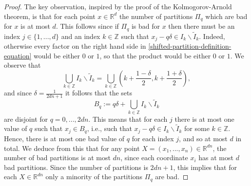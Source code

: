 \documentclass[twoside,11pt]{article}
\begin{document}
\begin{proof}
    The key observation, inspired by the proof of the Kolmogorov-Arnold theorem, is that for each point $x\in \mathbb{R}^d$ the number of partitions $\Pi_q$ which are bad for $x$ is at most $d$. This follows since if $\Pi_q$ is bad for $x$ then there must be an index $j \in \{1,...,d\}$ and an index $k\in \mathbb{Z}$ such that $x_j - q\delta\in I_k \backslash \tilde{I}_k$. Indeed, otherwise every factor on the right hand side in \eqref{shifted-partition-definition-equation} would be either $0$ or $1$, so that the product would be either $0$ or $1$. We observe that 
    \begin{equation}
        \bigcup_{k\in \mathbb{Z}} I_k \backslash \tilde{I}_k = \bigcup_{k\in \mathbb{Z}} \left(k + \frac{1-\delta}{2}, k + \frac{1+\delta}{2}\right),
    \end{equation}
    and since $\delta = \frac{1}{2dn+1}$ it follows that the sets
    \begin{equation}
        B_q := q\delta + \bigcup_{k\in \mathbb{Z}} I_k \backslash \tilde{I}_k
    \end{equation}
    are disjoint for $q = 0,...,2dn$. This means that for each $j$ there is at most one value of $q$ such that $x_j\in B_q$, i.e., such that $x_j - q\delta\in I_k \backslash \tilde{I}_k$ for some $k\in \mathbb{Z}$. Hence, there is at most one bad value of $q$ for each index $j$, and so at most $d$ in total. We deduce from this that for any point $X = (x_1,...,x_n)\in \mathbb{R}^{dn}$, the number of bad partitions is at most $dn$, since each coordinate $x_i$ has at most $d$ bad partitions. Since the number of partitions is $2dn+1$, this implies that for each $X\in \mathbb{R}^{dn}$ only a minority of the partitions $\Pi_q$ are bad.


\end{proof}
\end{document}
